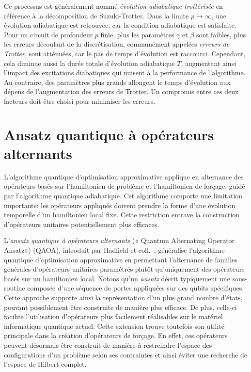  Ce processus est généralement nommé \textit{évolution adiabatique trottérisée} en référence à la décomposition de Suzuki-Trotter. Dans la limite $p \to \infty$, une évolution adiabatique est retrouvée, car la condition adiabatique est satisfaite. Pour un circuit de profondeur $p$ finie, plus les paramètres $\gamma$ et $\beta$ sont faibles, plus les erreurs découlant de la discrétisation, communément appelées \textit{erreurs de Trotter}, sont atténuées, car le pas de temps d'évolution est raccourci. Cependant, cela diminue aussi la durée totale d'évolution adiabatique $T$, augmentant ainsi l'impact des excitations diabatiques qui nuisent à la performance de l'algorithme. Au contraire, des paramètres plus grands allongent le temps d'évolution aux dépens de l'augmentation des erreurs de Trotter. Un compromis entre ces deux facteurs doit être choisi pour minimiser les erreurs.


\section{Ansatz quantique à opérateurs alternants}
\label{sec:ansatz-quantique-a-operateurs-alternants}

L'algorithme quantique d'optimisation approximative applique en alternance des opérateurs basés sur l'hamiltonien de problème et l'hamiltonien de forçage, guidé par l'algorithme quantique adiabatique. Cet algorithme comporte une limitation importante: les opérateurs appliqués doivent prendre la forme d'une évolution temporelle d'un hamiltonien local fixe. Cette restriction entrave la construction d'opérateurs unitaires potentiellement plus efficaces.

L'\textit{ansatz quantique à opérateurs alternants} (« Quantum Alternating Operator Ansatz») (QAOA), introduit par Hadfield et coll.~\cite{hadfieldQuantumApproximateOptimization2019}, généralise l'algorithme quantique d'optimisation approximative en permettant l'alternance de familles générales d'opérateurs unitaires paramétrés plutôt qu'uniquement des opérateurs basés sur un hamiltonien local. Notons qu'un \textit{ansatz} décrit typiquement une sous-routine composée d'une séquence de portes appliquées sur des qubits spécifiques. Cette approche supporte ainsi la représentation d'un plus grand nombre d'états, pouvant possiblement être construite de manière plus efficace. De plus, celle-ci facilite l'utilisation d'opérateurs plus facilement réalisables sur le matériel informatique quantique actuel. Cette extension trouve toutefois son utilité principale dans la création d'opérateurs de forçage. En effet, ces opérateurs peuvent désormais être construit de manière à restreindre l'espace des configurations d'un problème selon ses contraintes et ainsi éviter une recherche de l'espace de Hilbert complet. 

